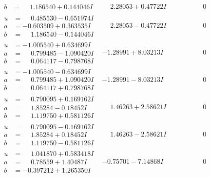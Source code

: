 \documentclass[1p]{elsarticle_modified}
\theoremstyle{definition}
\begin{document}
$$\begin{array}{c|c|c}
\begin{aligned}
b &= \phantom{-}1.186540 + 0.144046 I\end{aligned}
 & \phantom{-}2.28053 + 0.47722 I & \phantom{-0.000000 } 0 \\ \hline\begin{aligned}
u &= \phantom{-}0.485530 - 0.651974 I \\
a &= -0.603509 + 0.363535 I \\
b &= \phantom{-}1.186540 - 0.144046 I\end{aligned}
 & \phantom{-}2.28053 - 0.47722 I & \phantom{-0.000000 } 0 \\ \hline\begin{aligned}
u &= -1.005540 + 0.634699 I \\
a &= \phantom{-}0.799485 - 1.090420 I \\
b &= \phantom{-}0.064117 - 0.798768 I\end{aligned}
 & -1.28991 + 8.03213 I & \phantom{-0.000000 } 0 \\ \hline\begin{aligned}
u &= -1.005540 - 0.634699 I \\
a &= \phantom{-}0.799485 + 1.090420 I \\
b &= \phantom{-}0.064117 + 0.798768 I\end{aligned}
 & -1.28991 - 8.03213 I & \phantom{-0.000000 } 0 \\ \hline\begin{aligned}
u &= \phantom{-}0.790095 + 0.169162 I \\
a &= \phantom{-}1.85284 - 0.18452 I \\
b &= \phantom{-}1.119750 + 0.581126 I\end{aligned}
 & \phantom{-}1.46263 + 2.58621 I & \phantom{-0.000000 } 0 \\ \hline\begin{aligned}
u &= \phantom{-}0.790095 - 0.169162 I \\
a &= \phantom{-}1.85284 + 0.18452 I \\
b &= \phantom{-}1.119750 - 0.581126 I\end{aligned}
 & \phantom{-}1.46263 - 2.58621 I & \phantom{-0.000000 } 0 \\ \hline\begin{aligned}
u &= \phantom{-}1.041870 + 0.583418 I \\
a &= \phantom{-}0.78559 + 1.40487 I \\
b &= -0.397212 + 1.265350 I\end{aligned}
 & -0.75701 - 7.14868 I & \phantom{-0.000000 } 0 \\ \hline\begin{aligned}

\end{aligned}
\end{array}$$
\end{document}
